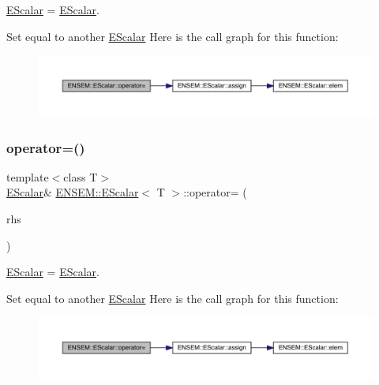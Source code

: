 \mbox{\hyperlink{classENSEM_1_1EScalar}{E\+Scalar}} = \mbox{\hyperlink{classENSEM_1_1EScalar}{E\+Scalar}}. 

Set equal to another \mbox{\hyperlink{classENSEM_1_1EScalar}{E\+Scalar}} Here is the call graph for this function\+:
\nopagebreak
\begin{figure}[H]
\begin{center}
\leavevmode
\includegraphics[width=350pt]{d0/d82/classENSEM_1_1EScalar_ade0daedd37868c24651613bb6f499fd4_cgraph}
\end{center}
\end{figure}
\mbox{\label{classENSEM_1_1EScalar_ade0daedd37868c24651613bb6f499fd4}} 
\subsubsection{\texorpdfstring{operator=()}{operator=()}\hspace{0.1cm}{\footnotesize\ttfamily [8/12]}}
{\footnotesize\ttfamily template$<$class T$>$ \\
\mbox{\hyperlink{classENSEM_1_1EScalar}{E\+Scalar}}\& \mbox{\hyperlink{classENSEM_1_1EScalar}{E\+N\+S\+E\+M\+::\+E\+Scalar}}$<$ T $>$\+::operator= (\begin{DoxyParamCaption}\item[{const \mbox{\hyperlink{classENSEM_1_1EScalar}{E\+Scalar}}$<$ T $>$ \&}]{rhs }\end{DoxyParamCaption})\hspace{0.3cm}{\ttfamily [inline]}}



\mbox{\hyperlink{classENSEM_1_1EScalar}{E\+Scalar}} = \mbox{\hyperlink{classENSEM_1_1EScalar}{E\+Scalar}}. 

Set equal to another \mbox{\hyperlink{classENSEM_1_1EScalar}{E\+Scalar}} Here is the call graph for this function\+:
\nopagebreak
\begin{figure}[H]
\begin{center}
\leavevmode
\includegraphics[width=350pt]{d0/d82/classENSEM_1_1EScalar_ade0daedd37868c24651613bb6f499fd4_cgraph}
\end{center}
\end{figure}
\mbox{\label{classENSEM_1_1EScalar_ade0daedd37868c24651613bb6f499fd4}} 
